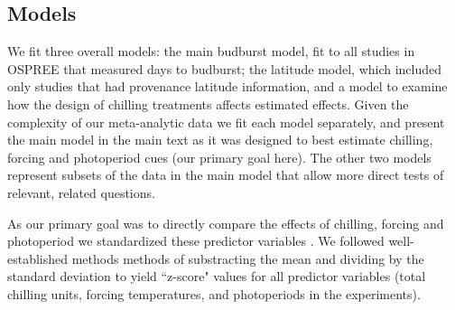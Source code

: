 \documentclass{article}
\begin{document}
\subsection*{Models}
\par We fit three overall models: the main budburst model, fit to all studies in OSPREE that measured days to budburst; the latitude model, which included only studies that had provenance latitude information, and a model to examine how the design of chilling treatments affects estimated effects. Given the complexity of our meta-analytic data we fit each model separately, and present the main model in the main text as it was designed to best estimate chilling, forcing and photoperiod cues (our primary goal here). The other two models represent subsets of the data in the main model that allow more direct tests of relevant, related questions. 

\par As our primary goal was to directly compare the effects of chilling, forcing and photoperiod we standardized these predictor variables \citep{gelman2006}. We followed well-established methods methods of substracting the mean and dividing by the standard deviation \citep{gelman2006} to yield ``z-score" values for all predictor variables (total chilling units, forcing temperatures, and photoperiods in the experiments). %
\end{document}
